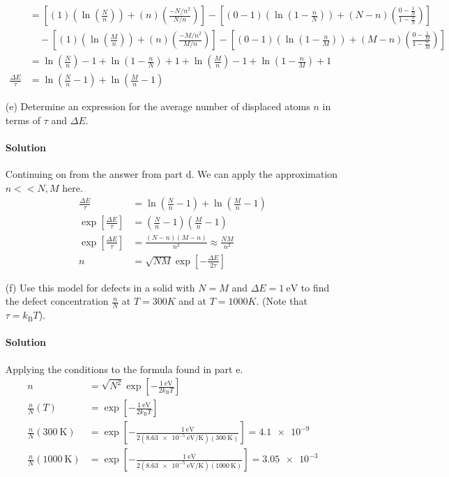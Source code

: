 \documentclass{article}
\begin{document}
\begin{enumerate}
\begin{align*}
			&= \left[ \left( 1 \right) \left( \ln(\frac{N}{n}) \right) + \left( n \right) \left( \frac{-N/n^2}{N/n} \right) \right] - \left[ \left( 0 - 1 \right) \left( \ln(1 - \frac{n}{N}) \right) + \left( N - n \right) \left( \frac{0 - \frac{1}{N}}{1 - \frac{n}{N}} \right) \right] \\
			&\quad- \left[ \left( 1 \right) \left( \ln(\frac{M}{n}) \right) + \left( n \right) \left( \frac{-M/n^2}{M/n} \right) \right] - \left[ \left( 0 - 1 \right) \left( \ln(1 - \frac{n}{M}) \right) + \left( M - n \right) \left( \frac{0 - \frac{1}{M}}{1 - \frac{n}{M}} \right) \right] \\
			&= \ln(\frac{N}{n}) - 1 + \ln(1 - \frac{n}{N}) + 1 + \ln(\frac{M}{n}) - 1 + \ln(1 - \frac{n}{M}) + 1 \\
			\frac{\Delta E}{\tau} &= \boxed{\ln(\frac{N}{n} - 1) + \ln(\frac{M}{n} - 1)}
		\end{align*}
		
		\item[(e)] Determine an expression for the average number of displaced atoms $n$ in terms of $\tau$ and $\Delta E$. 
		\paragraph{Solution} Continuing on from the answer from part d. We can apply the approximation $n << N,M$ here.
		\begin{align*}
			\frac{\Delta E}{\tau} &= \ln(\frac{N}{n} - 1) + \ln(\frac{M}{n} - 1) \\
			\exp\left[ \frac{\Delta E}{\tau} \right] &= \left(\frac{N}{n} - 1\right)\left(\frac{M}{n} - 1\right) \\
			\exp\left[ \frac{\Delta E}{\tau} \right] &= \frac{(N-n)(M-n)}{n^2} \approx \frac{NM}{n^2} \\
			n &= \boxed{\sqrt{NM} \exp[-\frac{\Delta E}{2\tau}]}
		\end{align*}
		
		\item[(f)] Use this model for defects in a solid with $N = M$ and $\Delta E = \qty{1}{\electronvolt}$ to find the defect concentration $\frac{n}{N}$ at $T = 300 K$ and at $T = 1000 K$. (Note that $\tau = k_\mathrm{B} T$).
		\paragraph{Solution} Applying the conditions to the formula found in part e.
		\begin{align*}
			n &= \sqrt{N^2} \exp[-\frac{\qty{1}{\electronvolt}}{2 k_\mathrm{B} T}] \\
			\frac{n}{N}(T) &= \exp[-\frac{\qty{1}{\electronvolt}}{2 k_\mathrm{B} T}] \\
			\frac{n}{N}(\qty{300}{\kelvin}) &= \exp[-\frac{\qty{1}{\electronvolt}}{2(\qty{8.63e-5}{\electronvolt\per\kelvin})(\qty{300}{\kelvin})}] = \boxed{\num{4.1e-9}} \\
			\frac{n}{N}(\qty{1000}{\kelvin}) &= \exp[-\frac{\qty{1}{\electronvolt}}{2(\qty{8.63e-5}{\electronvolt\per\kelvin})(\qty{1000}{\kelvin})}] = \boxed{\num{3.05e-3}}
		\end{align*}
		
	\end{enumerate}
			
	
\end{document}
